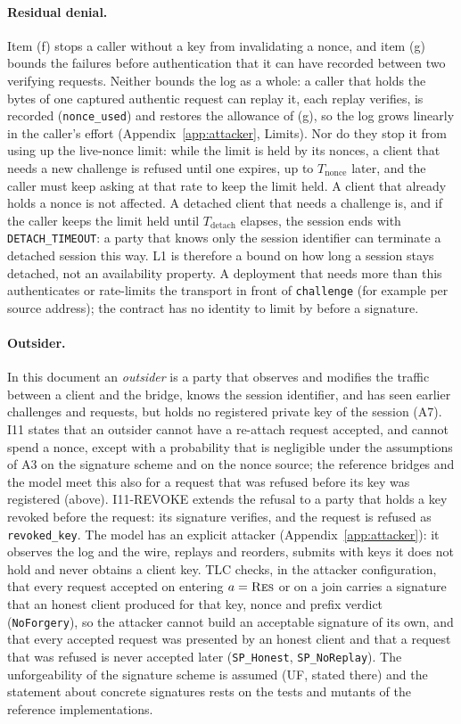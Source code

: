 \paragraph{Residual denial.} Item (f) stops a caller without a key from
invalidating a nonce, and item (g) bounds the failures before
authentication that it can have recorded between two verifying requests.
Neither bounds the log as a whole: a caller that holds the bytes of one
captured authentic request can replay it, each replay verifies, is
recorded (\texttt{nonce\_used}) and restores the allowance of (g), so the
log grows linearly in the caller's effort (Appendix~\ref{app:attacker},
Limits). Nor do they stop it from using up the live-nonce limit: while the limit is
held by its nonces, a client that needs a new challenge is refused until
one expires, up to $T_{\text{nonce}}$ later, and the caller must keep
asking at that rate to keep the limit held. A client that already holds a
nonce is not affected. A detached client that needs a challenge is, and if
the caller keeps the limit held until $T_{\text{detach}}$ elapses, the
session ends with \texttt{DETACH\_TIMEOUT}: a party that knows only the
session identifier can terminate a detached session this way. L1 is
therefore a bound on how long a session stays detached, not an
availability property. A deployment that needs more than this authenticates
or rate-limits the transport in front of \texttt{challenge} (for example
per source address); the contract has no identity to limit by before a
signature.

\paragraph{Outsider.} In this document an \emph{outsider} is a party that
observes and modifies the traffic between a client and the bridge, knows
the session identifier, and has seen earlier challenges and requests, but
holds no registered private key of the session (A7). I11 states that an
outsider cannot have a re-attach request accepted, and cannot spend a
nonce, except with a probability that is negligible under the assumptions
of A3 on the signature scheme and on the nonce source; the reference
bridges and the model meet this also for a request that was refused
before its key was registered (above). I11-REVOKE extends
the refusal to a party that holds a key revoked before the request: its
signature verifies, and the request is refused as \texttt{revoked\_key}.
The model has an explicit attacker (Appendix~\ref{app:attacker}): it observes
the log and the wire, replays and reorders, submits with keys it does not
hold and never obtains a client key. TLC checks, in the attacker
configuration, that every request accepted on entering $a=\textsc{Res}$ or
on a join carries a signature that an honest client produced for that key,
nonce and prefix verdict (\texttt{NoForgery}), so the attacker cannot build
an acceptable signature of its own, and that every accepted request was
presented by an honest client and that a request that was refused is never
accepted later (\texttt{SP\_Honest}, \texttt{SP\_NoReplay}). The unforgeability of the signature scheme is assumed
(UF, stated there) and the statement about concrete signatures rests on the
tests and mutants of the reference implementations.

